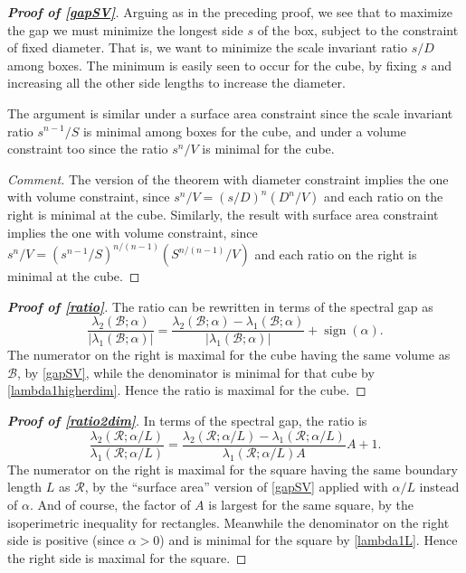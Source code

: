 \documentclass[12pt,reqno]{amsart}
\theoremstyle{definition}
\newcommand{\sign}{\operatorname{sign}}
\begin{document}
%
\begin{proof}[\bf Proof of \autoref{gapSV}]
Arguing as in the preceding proof, we see that to maximize the gap we must minimize the longest side $s$ of the box, subject to the constraint of fixed diameter. That is, we want to minimize the scale invariant ratio $s/D$ among boxes. The minimum is easily seen to occur for the cube, by fixing $s$ and increasing all the other side lengths to increase the diameter. 

The argument is similar under a surface area constraint since the scale invariant ratio $s^{n-1}/S$ is minimal among boxes for the cube, and under a volume constraint too since the ratio $s^n/V$ is minimal for the cube. 

\emph{Comment.} The version of the theorem with diameter constraint implies the one with volume constraint, since $s^n/V=(s/D)^n(D^n/V)$ and each ratio on the right is minimal at the cube. Similarly, the result with surface area constraint implies the one with volume constraint, since $s^n/V = (s^{n-1}/S)^{n/(n-1)}(S^{n/(n-1)}/V)$ and each ratio on the right is minimal at the cube. 
\end{proof}
%

%
\begin{proof}[\bf Proof of \autoref{ratio}]
The ratio can be rewritten in terms of the spectral gap as
\[
\frac{\lambda_2(\mathcal{B};\alpha)}{|\lambda_1(\mathcal{B};\alpha)|}
= 
\frac{\lambda_2(\mathcal{B};\alpha)-\lambda_1(\mathcal{B};\alpha)}{|\lambda_1(\mathcal{B};\alpha)|} + \sign(\alpha) .
\]
The numerator on the right is maximal for the cube having the same volume as $\mathcal{B}$, by \autoref{gapSV}, while the denominator is minimal for that cube by \autoref{lambda1higherdim}. Hence the ratio is maximal for the cube. 
\end{proof}
%

%
\begin{proof}[\bf Proof of \autoref{ratio2dim}]
In terms of the spectral gap, the ratio is
\[
\frac{\lambda_2(\mathcal{R};\alpha/L)}{\lambda_1(\mathcal{R};\alpha/L)}
= 
\frac{\lambda_2(\mathcal{R};\alpha/L)-\lambda_1(\mathcal{R};\alpha/L)}{\lambda_1(\mathcal{R};\alpha/L)A} A + 1 .
\]
The numerator on the right is maximal for the square having the same boundary length $L$ as $\mathcal{R}$, by the ``surface area'' version of \autoref{gapSV} applied with $\alpha/L$ instead of $\alpha$. And of course, the factor of $A$ is largest for the same square, by the isoperimetric inequality for rectangles. Meanwhile the denominator on the right side is positive (since $\alpha>0$) and is minimal for the square by \autoref{lambda1L}. Hence the right side is maximal for the square. 
\end{proof}
%
\end{document}
